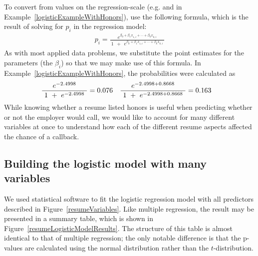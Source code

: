 To convert from values on the regression-scale
(e.g. \resHonorsInt{} and \resHonorsIntPlusCoef{} in
Example~\ref{logisticExampleWithHonors}),
use the following formula, which is the result
of solving for $p_i$ in the regression model:
\newcommand{\exponentialToSolveForPi}
    {e^{\beta_0 + \beta_1 x_{1,i}+\cdots+\beta_k x_{k,i}}}%
\begin{align*}
p_i = \frac{\exponentialToSolveForPi{}}
    {\ 1\ \ +\ \ \exponentialToSolveForPi{}\ }
\end{align*}
As with most applied data problems, we substitute the point estimates for the parameters (the $\beta_i$) so that we may make use of this formula. In Example~\ref{logisticExampleWithHonors}, the probabilities were calculated as
\begin{align*}
&\frac{\ e^{-2.4998{}}\ }
    {\ 1\ +\ e^{-2.4998{}}\ }
  = 0.076{} &&
\frac{\ e^{-2.4998{} + 0.8668{}}\ }
    {\ 1\ +\ e^{-2.4998{} + 0.8668{}}\ }
  = 0.163{}
\end{align*}
While knowing whether a resume listed honors is useful when
predicting whether or not the employer would call,
we would like to account for many different variables
at once to understand how each of the different resume aspects
affected the chance of a callback.


\subsection{Building the logistic model with many variables}

We used statistical software to fit the logistic regression
model with all \resNumPred{} predictors described in
Figure~\ref{resumeVariables}.
Like multiple regression, the result may be presented
in a summary table, which is shown in
Figure~\ref{resumeLogisticModelResults}.
The structure of this table is almost identical to that
of multiple regression;
the only notable difference is that the p-values are
calculated using the normal distribution rather than
the $t$-distribution.

